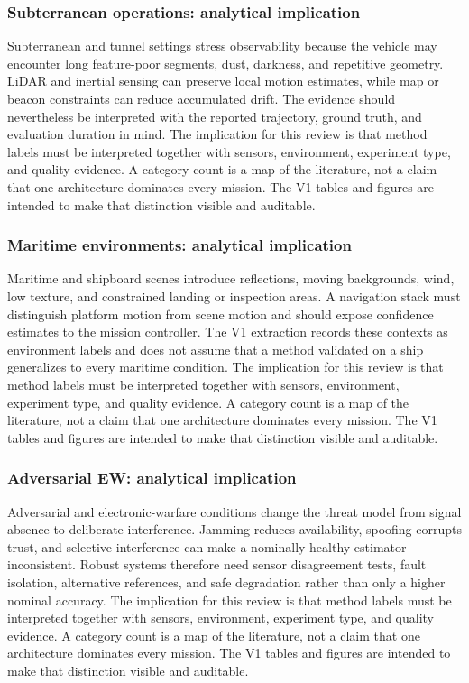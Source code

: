 \documentclass[
  journal,
  10pt]{IEEEtran}
\begin{document}
\subsubsection{Subterranean operations: analytical
implication}\label{subterranean-operations-analytical-implication-2}

Subterranean and tunnel settings stress observability because the
vehicle may encounter long feature-poor segments, dust, darkness, and
repetitive geometry. LiDAR and inertial sensing can preserve local
motion estimates, while map or beacon constraints can reduce accumulated
drift. The evidence should nevertheless be interpreted with the reported
trajectory, ground truth, and evaluation duration in mind. The
implication for this review is that method labels must be interpreted
together with sensors, environment, experiment type, and quality
evidence. A category count is a map of the literature, not a claim that
one architecture dominates every mission. The V1 tables and figures are
intended to make that distinction visible and auditable.

\subsubsection{Maritime environments: analytical
implication}\label{maritime-environments-analytical-implication-2}

Maritime and shipboard scenes introduce reflections, moving backgrounds,
wind, low texture, and constrained landing or inspection areas. A
navigation stack must distinguish platform motion from scene motion and
should expose confidence estimates to the mission controller. The V1
extraction records these contexts as environment labels and does not
assume that a method validated on a ship generalizes to every maritime
condition. The implication for this review is that method labels must be
interpreted together with sensors, environment, experiment type, and
quality evidence. A category count is a map of the literature, not a
claim that one architecture dominates every mission. The V1 tables and
figures are intended to make that distinction visible and auditable.

\subsubsection{Adversarial EW: analytical
implication}\label{adversarial-ew-analytical-implication-2}

Adversarial and electronic-warfare conditions change the threat model
from signal absence to deliberate interference. Jamming reduces
availability, spoofing corrupts trust, and selective interference can
make a nominally healthy estimator inconsistent. Robust systems
therefore need sensor disagreement tests, fault isolation, alternative
references, and safe degradation rather than only a higher nominal
accuracy. The implication for this review is that method labels must be
interpreted together with sensors, environment, experiment type, and
quality evidence. A category count is a map of the literature, not a
claim that one architecture dominates every mission. The V1 tables and
figures are intended to make that distinction visible and auditable.
\end{document}
